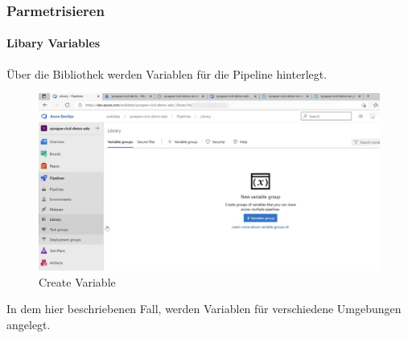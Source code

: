 \subsubsection{Parmetrisieren}
\paragraph{Libary Variables}
Über die Bibliothek werden Variablen für die Pipeline hinterlegt.
\begin{figure}[H]
	\centering
	\includegraphics[scale = 0.2]{attachment/chapter_2/Scc155}
	\caption{Create Variable}
\end{figure}

In dem hier beschriebenen Fall, werden Variablen für verschiedene Umgebungen angelegt.


